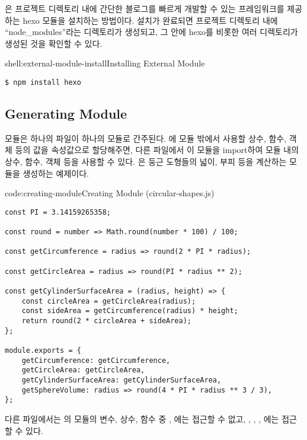 은 프로젝트 디렉토리 내에 간단한 블로그를 빠르게 개발할 수 있는 프레임워크를 제공하는 hexo 모듈을 설치하는 방법이다. 설치가 완료되면 프로젝트 디렉토리 내에 ``node\_modules''라는 디렉토리가 생성되고, 그 안에 hexo를 비롯한 여러 디렉토리가 생성된 것을 확인할 수 있다.

\begin{shellenv}{shell:external-module-install}{Installing External Module}\begin{verbatim}
$ npm install hexo
\end{verbatim}
\end{shellenv}

\subsection*{Generating Module}

모듈은 하나의 파일이 하나의 모듈로 간주된다. 에 모듈 밖에서 사용할 상수, 함수, 객체 등의 값을 속성값으로 할당해주면, 다른 파일에서 이 모듈을 import하여 모듈 내의 상수, 함수, 객체 등을 사용할 수 있다. 은 둥근 도형들의 넓이, 부피 등을 계산하는 모듈을 생성하는 예제이다.

\begin{codeenv}{code:creating-module}{Creating Module (circular-shapes.js)}\begin{verbatim}
const PI = 3.14159265358;

const round = number => Math.round(number * 100) / 100;

const getCircumference = radius => round(2 * PI * radius);

const getCircleArea = radius => round(PI * radius ** 2);

const getCylinderSurfaceArea = (radius, height) => {
    const circleArea = getCircleArea(radius);
    const sideArea = getCircumference(radius) * height;
    return round(2 * circleArea + sideArea);
};

module.exports = {
    getCircumference: getCircumference,
    getCircleArea: getCircleArea,
    getCylinderSurfaceArea: getCylinderSurfaceArea,
    getSphereVolume: radius => round(4 * PI * radius ** 3 / 3),
};
\end{verbatim}
\end{codeenv}

다른 파일에서는 의 모듈의 변수, 상수, 함수 중 , 에는 접근할 수 없고, , , , 에는 접근할 수 있다.

